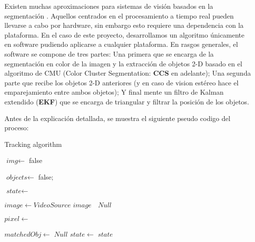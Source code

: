 Existen muchas aproximaciones para sistemas de visi\'on basados en la segmentaci\'on \cite{fast_segmentation_Mitra} \cite{fuzzy_segmentation}. Aquellos centrados en el procesamiento a tiempo real pueden llevarse a cabo por hardware, sin embargo esto requiere una dependencia con la plataforma. En el caso de este proyecto, desarrollamos un algoritmo \'unicamente en software pudiendo aplicarse a cualquier plataforma. En rasgos generales, el software se compone de tres partes: Una primera que se encarga de la segmentación en color de la imagen y la extracción de objetos 2-D basado en el algoritmo de CMU \cite{JamesBruce_CMU_SEG} (Color Cluster Segmentation: \textbf{CCS} en adelante); Una segunda parte que recibe los objetos 2-D anteriores (y en caso de vision est\'ereo hace el emparejamiento entre ambos objetos); Y final mente un filtro de Kalman extendido \cite{GabrielTerejanu_EKF} (\textbf{EKF}) que se encarga de triangular y filtrar la posición de los objetos. 

Antes de la explicaci\'on detallada, se muestra el siguiente pseudo codigo del proceso:

\begin{algorithm}[hp]
\caption{Tracking algorithm}\label{algorithm_pseudo}
	\begin{algorithmic}[1]
		\State {}
		\State {}
		\State $\textit{img}  \gets$ 
			\State \Return false
		\EndIf
		
		\State $\textit{objects} \gets$ 
			\State \Return false;
		\EndIf
		
		\State $\textit{state} \gets$ 
	\EndProcedure
	
			\State $image \gets VideoSource$
			\Return $image$
		\Else $\;$
			\State \Return $Null$
		\EndIf
		
	\EndProcedure
	
			\State {}
		\EndIf
			\State $pixel \gets$ 
		\EndFor
			\State \Return {}
	\EndProcedure
	
		\State $matchedObj \gets$  
			\State \Return $Null$
		\EndIf
		\State $state \gets$ 
		\State \Return $state$
	\EndProcedure
	
	\end{algorithmic}
\end{algorithm}
